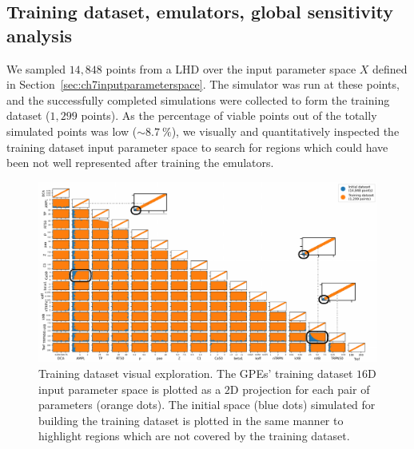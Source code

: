 %
%
%
\subsection{Training dataset, emulators, global sensitivity analysis}\label{sec:ch7training_dataset_emulators_global_sensitivity_analysis}
We sampled $14,848$ points from a LHD over the input parameter space $X$ defined in Section~\ref{sec:ch7inputparameterspace}. The simulator was run at these points, and the successfully completed simulations were collected to form the training dataset ($1,299$ points). As the percentage of viable points out of the totally simulated points was low ($\sim\SI{8.7}{\percent}$), we visually and quantitatively inspected the training dataset input parameter space to search for regions which could have been not well represented after training the emulators.

\begin{figure}[ht!]
    \myfloatalign
    \includegraphics[width=\textwidth]{figures/chapter07/space_examined.pdf}
    \caption{Training dataset visual exploration. The GPEs' training dataset $16$D input parameter space is plotted as a $2$D projection for each pair of parameters (orange dots). The initial space (blue dots) simulated for building the training dataset is plotted in the same manner to highlight regions which are not covered by the training dataset.}
    \label{fig:trainingspaceexamined}
\end{figure}

